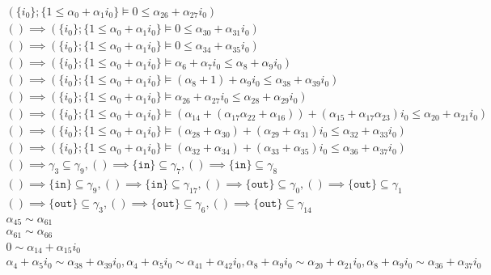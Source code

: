 {\begin{align*}
(\{i_{0}\};\{1 \leq \alpha_{0} + \alpha_{1}i_{0}\}  \vDash 0 \leq \alpha_{26} + \alpha_{27}i_{0})\\ () \implies (\{i_{0}\};\{1 \leq \alpha_{0} + \alpha_{1}i_{0}\}  \vDash 0 \leq \alpha_{30} + \alpha_{31}i_{0})\\ () \implies (\{i_{0}\};\{1 \leq \alpha_{0} + \alpha_{1}i_{0}\}  \vDash 0 \leq \alpha_{34} + \alpha_{35}i_{0})\\ () \implies (\{i_{0}\};\{1 \leq \alpha_{0} + \alpha_{1}i_{0}\}  \vDash \alpha_{6} + \alpha_{7}i_{0} \leq \alpha_{8} + \alpha_{9}i_{0})\\ () \implies (\{i_{0}\};\{1 \leq \alpha_{0} + \alpha_{1}i_{0}\}  \vDash (\alpha_{8}+1) + \alpha_{9}i_{0} \leq \alpha_{38} + \alpha_{39}i_{0})\\ () \implies (\{i_{0}\};\{1 \leq \alpha_{0} + \alpha_{1}i_{0}\}  \vDash \alpha_{26} + \alpha_{27}i_{0} \leq \alpha_{28} + \alpha_{29}i_{0})\\ () \implies (\{i_{0}\};\{1 \leq \alpha_{0} + \alpha_{1}i_{0}\}  \vDash (\alpha_{14}+(\alpha_{17}\alpha_{22}+\alpha_{16})) + (\alpha_{15}+\alpha_{17}\alpha_{23})i_{0} \leq \alpha_{20} + \alpha_{21}i_{0})\\ () \implies (\{i_{0}\};\{1 \leq \alpha_{0} + \alpha_{1}i_{0}\}  \vDash (\alpha_{28}+\alpha_{30}) + (\alpha_{29}+\alpha_{31})i_{0} \leq \alpha_{32} + \alpha_{33}i_{0})\\ () \implies (\{i_{0}\};\{1 \leq \alpha_{0} + \alpha_{1}i_{0}\}  \vDash (\alpha_{32}+\alpha_{34}) + (\alpha_{33}+\alpha_{35})i_{0} \leq \alpha_{36} + \alpha_{37}i_{0})\\ 
    () \implies \gamma_{3} \subseteq \gamma_{9}, () \implies \{\texttt{in}\} \subseteq \gamma_{7}, () \implies \{\texttt{in}\} \subseteq \gamma_{8}\\ 
    () \implies \{\texttt{in}\} \subseteq \gamma_{9}, () \implies \{\texttt{in}\} \subseteq \gamma_{17}, () \implies \{\texttt{out}\} \subseteq \gamma_{0}, () \implies \{\texttt{out}\} \subseteq \gamma_{1}\\ 
    () \implies \{\texttt{out}\} \subseteq \gamma_{3}, () \implies \{\texttt{out}\} \subseteq \gamma_{6}, () \implies \{\texttt{out}\} \subseteq \gamma_{14}\\ \alpha_{45} \sim \alpha_{61}\\ \alpha_{61} \sim \alpha_{66}\\ 0 \sim \alpha_{14} + \alpha_{15}i_{0}\\ \alpha_{4} + \alpha_{5}i_{0} \sim \alpha_{38} + \alpha_{39}i_{0}, \alpha_{4} + \alpha_{5}i_{0} \sim \alpha_{41} + \alpha_{42}i_{0}, \alpha_{8} + \alpha_{9}i_{0} \sim \alpha_{20} + \alpha_{21}i_{0}, \alpha_{8} + \alpha_{9}i_{0} \sim \alpha_{36} + \alpha_{37}i_{0}
\end{align*}

}

